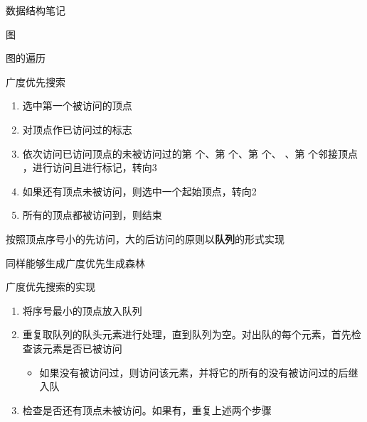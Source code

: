 \documentclass[
  ignorenonframetext,
]{beamer}
\providecommand{\tightlist}{%
  \setlength{\itemsep}{0pt}\setlength{\parskip}{0pt}}
\begin{document}
\begin{frame}[fragile]{数据结构笔记}
\begin{block}{图}
\begin{block}{图的遍历}
\begin{block}{广度优先搜索}
\protect{}\label{ux5e7fux5ea6ux4f18ux5148ux641cux7d22}
\begin{enumerate}
\tightlist
\item
  选中第一个被访问的顶点
\item
  对顶点作已访问过的标志
\item
  依次访问已访问顶点的未被访问过的第 {} 个、第 {} 个、第 {} 个、{} 、第
  {} 个邻接顶点 {} ，进行访问且进行标记，转向3
\item
  如果还有顶点未被访问，则选中一个起始顶点，转向2
\item
  所有的顶点都被访问到，则结束
\end{enumerate}

按照顶点序号小的先访问，大的后访问的原则以\textbf{队列}的形式实现

同样能够生成广度优先生成森林

\begin{block}{广度优先搜索的实现}
\protect{}\label{ux5e7fux5ea6ux4f18ux5148ux641cux7d22ux7684ux5b9eux73b0}
\begin{enumerate}
\tightlist
\item
  将序号最小的顶点放入队列
\item
  重复取队列的队头元素进行处理，直到队列为空。对出队的每个元素，首先检查该元素是否已被访问

  \begin{itemize}
  \tightlist
  \item
    如果没有被访问过，则访问该元素，并将它的所有的没有被访问过的后继入队
  \end{itemize}
\item
  检查是否还有顶点未被访问。如果有，重复上述两个步骤
\end{enumerate}


\end{block}
\end{block}
\end{block}
\end{block}
\end{frame}
\end{document}
